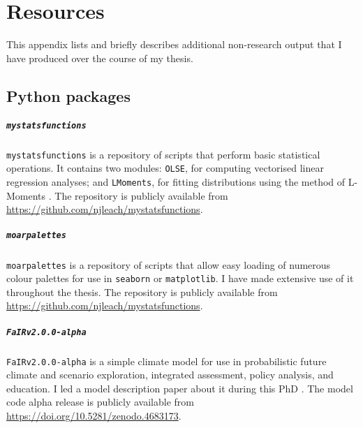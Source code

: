 \chapter{\label{resources}Resources}

This appendix lists and briefly describes additional non-research output that I have produced over the course of my thesis.

\section{Python packages}

  \paragraph*{\texttt{mystatsfunctions}}
    
    \texttt{mystatsfunctions} is a repository of scripts that perform basic statistical operations. It contains two modules: \texttt{OLSE}, for computing vectorised linear regression analyses; and \texttt{LMoments}, for fitting distributions using the method of L-Moments \citep{hosking_estimation_1985,hosking_parameter_1987,hosking_l-moments_1990,hosking_regional_1997}. The repository is publicly available from \url{https://github.com/njleach/mystatsfunctions}.

  \paragraph*{\texttt{moarpalettes}}
    
    \texttt{moarpalettes} is a repository of scripts that allow easy loading of numerous colour palettes for use in \texttt{seaborn} or \texttt{matplotlib}. I have made extensive use of it throughout the thesis. The repository is publicly available from \url{https://github.com/njleach/mystatsfunctions}.

  \paragraph*{\texttt{FaIRv2.0.0-alpha}}
    
    \texttt{FaIRv2.0.0-alpha} is a simple climate model for use in probabilistic future climate and scenario exploration, integrated assessment, policy analysis, and education. I led a model description paper about it during this PhD \citep{leach_fairv200_2021}. The model code alpha release is publicly available from \url{https://doi.org/10.5281/zenodo.4683173}.

